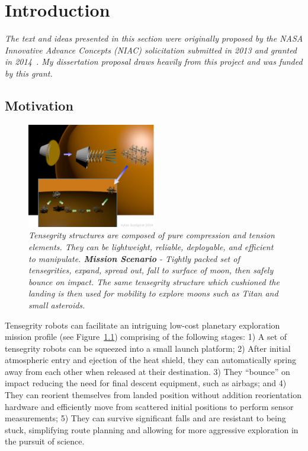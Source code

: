 \chapter{Introduction}
\begin{singlespace}
\emph{The text and ideas presented in this section were originally proposed by the NASA Innovative Advance Concepts (NIAC) solicitation submitted in 2013 and granted in 2014~\cite{NIACfinalreport}.
My dissertation proposal draws heavily from this project and was funded by this grant.}
\end{singlespace}

\section{Motivation}

\begin{figure}[htb]
   \centering
   \includegraphics[width=0.5\textwidth]{tex/img/fig_aeroshell_summary} 
   \caption{{\em Tensegrity structures are composed of pure compression and tension elements. They can be lightweight, reliable, deployable, and efficient to manipulate. {\bf Mission Scenario} - Tightly packed set of tensegrities, expand, spread out, fall to surface of moon, then safely bounce on impact. The same tensegrity structure which cushioned the landing is then used for mobility to explore moons such as Titan and small asteroids.}}
   \label{fig:unpack}
\end{figure}

Tensegrity robots can facilitate an intriguing low-cost planetary exploration mission profile (see Figure~\ref{fig:unpack}) comprising of the following stages:  1) A set of tensegrity robots can be squeezed into a small launch platform; 2)  After initial atmospheric entry and ejection of the heat shield, they can automatically spring away from each other when released at their destination. 3) They ``bounce'' on impact reducing the need for final descent equipment, such as airbags; and 4) They can reorient themselves from landed position without addition reorientation hardware and efficiently move from scattered initial positions to perform sensor measurements; 5) They can survive significant falls and are resistant to being stuck, simplifying route planning and allowing for more aggressive exploration in the pursuit of science.

